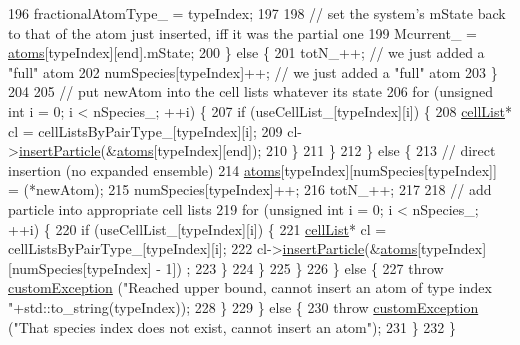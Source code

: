 \begin{DoxyCode}
196                     fractionalAtomType\_ = typeIndex;
197 
198                     \textcolor{comment}{// set the system's mState back to that of the atom just inserted, iff it was the
       partial one}
199                     Mcurrent\_ = \hyperlink{classsim_system_a90421b19082f7fb8fc23b7264b1161e4}{atoms}[typeIndex][end].mState;
200                 \} \textcolor{keywordflow}{else} \{
201                     totN\_++; \textcolor{comment}{// we just added a "full" atom}
202                     numSpecies[typeIndex]++; \textcolor{comment}{// we just added a "full" atom}
203                 \}
204 
205                 \textcolor{comment}{// put newAtom into the cell lists whatever its state}
206                 \textcolor{keywordflow}{for} (\textcolor{keywordtype}{unsigned} \textcolor{keywordtype}{int} i = 0; i < nSpecies\_; ++i) \{
207                     \textcolor{keywordflow}{if} (useCellList\_[typeIndex][i]) \{
208                         \hyperlink{classcell_list}{cellList}* cl = cellListsByPairType\_[typeIndex][i];
209                         cl->\hyperlink{classcell_list_a56c0012eed483e47248f9065bfc70fce}{insertParticle}(&\hyperlink{classsim_system_a90421b19082f7fb8fc23b7264b1161e4}{atoms}[typeIndex][end]);
210                     \}
211                 \}
212             \} \textcolor{keywordflow}{else} \{
213                 \textcolor{comment}{// direct insertion (no expanded ensemble)}
214                 \hyperlink{classsim_system_a90421b19082f7fb8fc23b7264b1161e4}{atoms}[typeIndex][numSpecies[typeIndex]] = (*newAtom);
215                 numSpecies[typeIndex]++;
216                 totN\_++;
217 
218                 \textcolor{comment}{// add particle into appropriate cell lists}
219                 \textcolor{keywordflow}{for} (\textcolor{keywordtype}{unsigned} \textcolor{keywordtype}{int} i = 0; i < nSpecies\_; ++i) \{
220                     \textcolor{keywordflow}{if} (useCellList\_[typeIndex][i]) \{
221                         \hyperlink{classcell_list}{cellList}* cl = cellListsByPairType\_[typeIndex][i];
222                         cl->\hyperlink{classcell_list_a56c0012eed483e47248f9065bfc70fce}{insertParticle}(&\hyperlink{classsim_system_a90421b19082f7fb8fc23b7264b1161e4}{atoms}[typeIndex][numSpecies[typeIndex] - 1])
      ;
223                     \}
224                 \}
225             \}
226         \} \textcolor{keywordflow}{else} \{
227             \textcolor{keywordflow}{throw} \hyperlink{classcustom_exception}{customException} (\textcolor{stringliteral}{"Reached upper bound, cannot insert an atom of type index
       "}+std::to\_string(typeIndex));
228         \}
229     \} \textcolor{keywordflow}{else} \{
230         \textcolor{keywordflow}{throw} \hyperlink{classcustom_exception}{customException} (\textcolor{stringliteral}{"That species index does not exist, cannot insert an atom"});
231     \}
232 \}
\end{DoxyCode}
